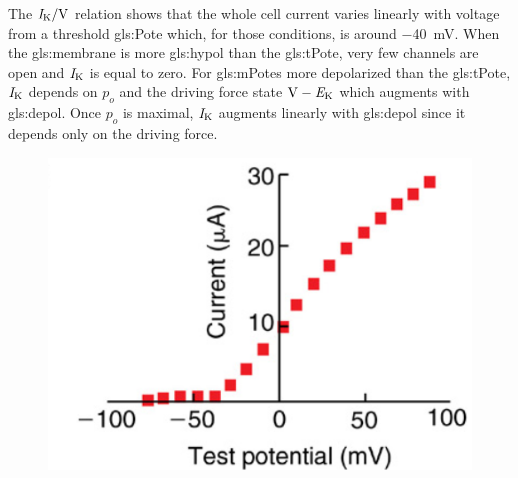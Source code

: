 \documentclass[class={myRUCProject}, crop=false]{standalone}
\begin{document}
The \(\curr\potassium/\unit{\V}\) relation shows that the whole cell current varies linearly with voltage from a threshold \gls{gls:Pote} which, for those conditions, is around \qty{-40}{\mV}. When the \gls{gls:membrane} is more \gls{gls:hypol} than the \gls{gls:tPote}, very few channels are open and \(\mathit{I}_\mathrm{K}\) is equal to zero. For \glspl{gls:mPote} more depolarized than the \gls{gls:tPote}, \(\mathit{I}_\mathrm{K}\) depends on \(p_o\) and the driving force state \(\unit{\V} - \equi\potassium\) which augments with \gls{gls:depol}. Once \(p_o\) is maximal, \(\mathit{I}_\mathrm{K}\) augments linearly with \gls{gls:depol} since it depends only on the driving force. 
\begin{figure}[H]
    \centering
    \includegraphics[width=0.4\linewidth]{Pictures//Anakin/IK-V.png}
    \caption{}\label{fig:Kcurrent}
\end{figure}
\end{document}
